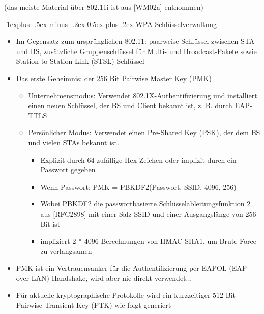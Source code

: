 \documentclass[a4paper]{article}
\makeatletter
\renewcommand{\subsection}{\@startsection{subsection}{2}{0mm}%
 {-1explus -.5ex minus -.2ex}%
 {0.5ex plus .2ex}%
 {\normalfont\normalsize\bfseries}}
\makeatother
\begin{document}
\begin{multicols}{3}
    (das meiste Material über 802.11i ist aus {[}WM02a{]} entnommen)


    \subsection{WPA-Schlüsselverwaltung}

    \begin{itemize}
        \item
              Im Gegensatz zum ursprünglichen 802.11: paarweise Schlüssel zwischen
              STA und BS, zusätzliche Gruppenschlüssel für Multi- und
              Broadcast-Pakete sowie Station-to-Station-Link (STSL)-Schlüssel
        \item
              Das erste Geheimnis: der 256 Bit Pairwise Master Key (PMK)

              \begin{itemize}
                  \item
                        Unternehmensmodus: Verwendet 802.1X-Authentifizierung und
                        installiert einen neuen Schlüssel, der BS und Client bekannt ist, z.
                        B. durch EAP-TTLS
                  \item
                        Persönlicher Modus: Verwendet einen Pre-Shared Key (PSK), der dem BS
                        und vielen STAs bekannt ist.

                        \begin{itemize}
                            \item
                                  Explizit durch 64 zufällige Hex-Zeichen oder implizit durch ein
                                  Passwort gegeben
                            \item
                                  Wenn Passwort: PMK = PBKDF2(Passwort, SSID, 4096, 256)
                            \item
                                  Wobei PBKDF2 die passwortbasierte Schlüsselableitungsfunktion 2
                                  aus {[}RFC2898{]} mit einer Salz-SSID und einer Ausgangslänge von
                                  256 Bit ist
                            \item
                                  impliziert 2 * 4096 Berechnungen von HMAC-SHA1, um Brute-Force zu
                                  verlangsamen
                        \end{itemize}
              \end{itemize}
        \item
              PMK ist ein Vertrauensanker für die Authentifizierung per EAPOL (EAP
              over LAN) Handshake, wird aber nie direkt verwendet...
        \item
              Für aktuelle kryptographische Protokolle wird ein kurzzeitiger 512 Bit
              Pairwise Transient Key (PTK) wie folgt generiert


\end{itemize}
\end{multicols}
\end{document}
